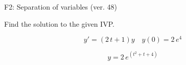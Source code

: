 \begin{exercise}
  \begin{exerciseTitle}F2: Separation of variables (ver. 48)\end{exerciseTitle}
  \begin{exerciseStatement}
    
Find the solution to the given IVP.

    
\[y'=( 2 \, t + 1 )y\hspace{1em} y(0)= 2 \, e^{4}\]

  \end{exerciseStatement}
  \begin{exerciseAnswer}
    
\[y= 2 \, e^{\left(t^{2} + t + 4\right)}\]

  \end{exerciseAnswer}
\end{exercise}